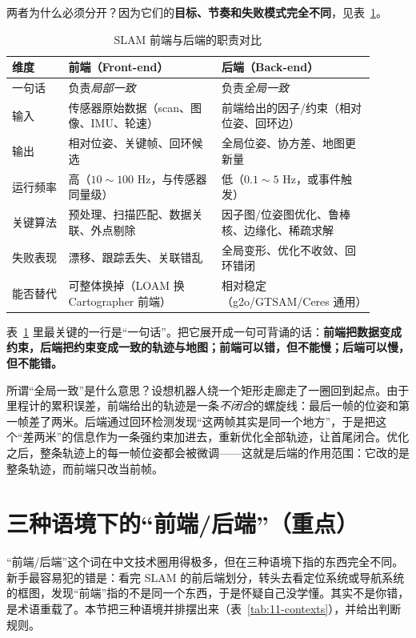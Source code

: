 两者为什么必须分开？因为它们的\textbf{目标、节奏和失败模式完全不同}，见表~\ref{tab:11-fe-be}。

\begin{table}[htbp]
  \centering
  \caption{SLAM 前端与后端的职责对比}\label{tab:11-fe-be}
  \small
  \begin{tabular}{p{0.14\linewidth}p{0.38\linewidth}p{0.38\linewidth}}
    \toprule
    维度 & 前端（Front-end） & 后端（Back-end） \\
    \midrule
    一句话 & 负责\emph{局部一致} & 负责\emph{全局一致} \\
    输入 & 传感器原始数据（scan、图像、IMU、轮速） & 前端给出的因子/约束（相对位姿、回环边） \\
    输出 & 相对位姿、关键帧、回环候选 & 全局位姿、协方差、地图更新量 \\
    运行频率 & 高（$10\sim100$ Hz，与传感器同量级） & 低（$0.1\sim5$ Hz，或事件触发） \\
    关键算法 & 预处理、扫描匹配、数据关联、外点剔除 & 因子图/位姿图优化、鲁棒核、边缘化、稀疏求解 \\
    失败表现 & 漂移、跟踪丢失、关联错乱 & 全局变形、优化不收敛、回环错闭 \\
    能否替代 & 可整体换掉（LOAM 换 Cartographer 前端） & 相对稳定（g2o/GTSAM/Ceres 通用） \\
    \bottomrule
  \end{tabular}
\end{table}

表~\ref{tab:11-fe-be} 里最关键的一行是``一句话''。把它展开成一句可背诵的话：\textbf{前端把数据变成约束，后端把约束变成一致的轨迹与地图；前端可以错，但不能慢；后端可以慢，但不能错。}

所谓``全局一致''是什么意思？设想机器人绕一个矩形走廊走了一圈回到起点。由于里程计的累积误差，前端给出的轨迹是一条\emph{不闭合}的螺旋线：最后一帧的位姿和第一帧差了两米。后端通过回环检测发现``这两帧其实是同一个地方''，于是把这个``差两米''的信息作为一条强约束加进去，重新优化全部轨迹，让首尾闭合。优化之后，整条轨迹上的每一帧位姿都会被微调——这就是后端的作用范围：它改的是整条轨迹，而前端只改当前帧。

\section{三种语境下的``前端/后端''（重点）}\label{sec:11-three-contexts}

``前端/后端''这个词在中文技术圈用得极多，但在三种语境下指的东西完全不同。新手最容易犯的错是：看完 SLAM 的前后端划分，转头去看定位系统或导航系统的框图，发现``前端''指的不是同一个东西，于是怀疑自己没学懂。其实不是你错，是术语重载了。本节把三种语境并排摆出来（表~\ref{tab:11-contexts}），并给出判断规则。

